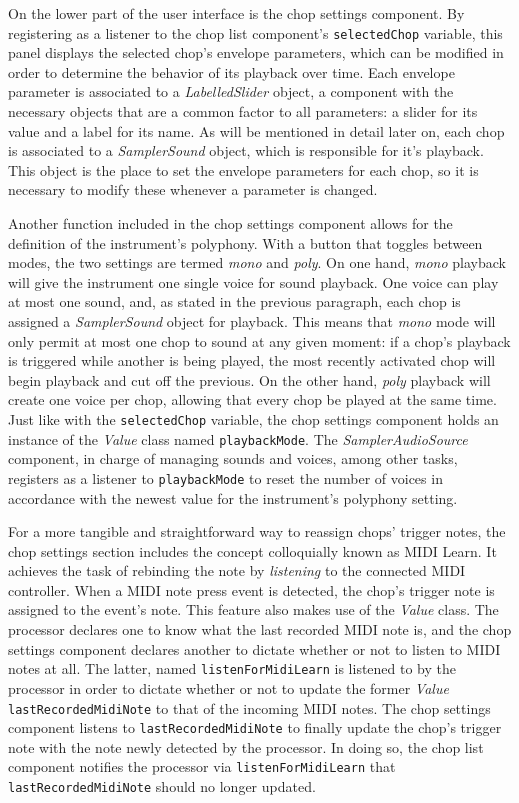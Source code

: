 \documentclass[12pt, a4paper, hidelinks]{article}
\begin{document}
	On the lower part of the user interface is the chop settings component. By registering as a listener to the chop list component's \texttt{selectedChop} variable, this panel displays the selected chop's envelope parameters, which can be modified in order to determine the behavior of its playback over time. Each envelope parameter is associated to a \textit{LabelledSlider} object, a component with the necessary objects that are a common factor to all parameters: a slider for its value and a label for its name. As will be mentioned in detail later on, each chop is associated to a \textit{SamplerSound} object, which is responsible for it's playback. This object is the place to set the envelope parameters for each chop, so it is necessary to modify these whenever a parameter is changed. \par
	
	Another function included in the chop settings component allows for the definition of the instrument's polyphony. With a button that toggles between modes, the two settings are termed \textit{mono} and \textit{poly}. On one hand, \textit{mono} playback will give the instrument one single voice for sound playback. One voice can play at most one sound, and, as stated in the previous paragraph, each chop is assigned a \textit{SamplerSound} object for playback. This means that \textit{mono} mode will only permit at most one chop to sound at any given moment: if a chop's playback is triggered while another is being played, the most recently activated chop will begin playback and cut off the previous. On the other hand, \textit{poly} playback will create one voice per chop, allowing that every chop be played at the same time. Just like with the \texttt{selectedChop} variable, the chop settings component holds an instance of the \textit{Value} class named \texttt{playbackMode}. The \textit{SamplerAudioSource} component, in charge of managing sounds and voices, among other tasks, registers as a listener to \texttt{playbackMode} to reset the number of voices in accordance with the newest value for the instrument's polyphony setting.\par
	
	For a more tangible and straightforward way to reassign chops' trigger notes, the chop settings section includes the concept colloquially known as MIDI Learn. It achieves the task of rebinding the note by \textit{listening} to the connected MIDI controller. When a MIDI note press event is detected, the chop's trigger note is assigned to the event's note. This feature also makes use of the \textit{Value} class.  The processor declares one to know what the last recorded MIDI note is, and the chop settings component declares another to dictate whether or not to listen to MIDI notes at all. The latter, named \texttt{listenForMidiLearn} is listened to by the processor in order to dictate whether or not to update the former \textit{Value} \texttt{lastRecordedMidiNote} to that of the incoming MIDI notes. The chop settings component listens to \texttt{lastRecordedMidiNote} to finally update the chop's trigger note with the note newly detected by the processor. In doing so, the chop list component notifies the processor via \texttt{listenForMidiLearn} that \texttt{lastRecordedMidiNote} should no longer updated.
	
\end{document}
